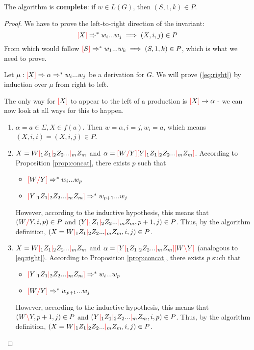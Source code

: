 \documentclass[main.tex]{subfiles}
\begin{document}
\begin{prop}
    The algorithm is \textbf{complete}: if $w \in L(G)$, then $(S, 1, k) \in P$.
\end{prop}
\begin{proof}
    We have to prove the left-to-right direction of the invariant:
    \begin{equation}\label{eq:right}
        \textcolor{red}{[} X \textcolor{red}{]} \Rightarrow^* w_i ... w_j \implies (X, i, j) \in P
    \end{equation}
    From which would follow $ \textcolor{red}{[} S \textcolor{red}{]} \Rightarrow^* w_1 ... w_k \implies (S, 1, k) \in P$,
    which is what we need to prove.

    Let $\mu: \textcolor{red}{[} X \textcolor{red}{]} \Rightarrow \alpha \Rightarrow^* w_i ... w_j$
    be a derivation for $G$. We will prove (\ref{eq:right}) by induction over
    $\mu$ from right to left.

    The only way for $\textcolor{red}{[} X \textcolor{red}{]}$ to appear to the left
    of a production is $\textcolor{red}{[} X \textcolor{red}{]} \rightarrow \alpha$ - we can now look at
    all ways for this to happen.
    \begin{enumerate}
        \item $\alpha = a \in \Sigma, X \in f(a)$. Then $w = \alpha, i = j, w_i = a$,
            which means $(X, i, i) = (X, i, j) \in P$.
        \item $X = W \textcolor{red}{|}_1 Z_1 \textcolor{red}{|}_2 Z_2 ... \textcolor{red}{|}_m Z_m$ and
            $\alpha = \textcolor{red}{[} W \textcolor{red}{/} Y \textcolor{red}{]} \textcolor{red}{[} Y \textcolor{red}{|}_1 Z_1 \textcolor{red}{|}_2 Z_2 ... \textcolor{red}{|}_m Z_m \textcolor{red}{]}$.
            According to Proposition \ref{prop:concat}, there exists $p$ such that
            \begin{itemize}
                \item $\textcolor{red}{[} W \textcolor{red}{/} Y \textcolor{red}{]} \Rightarrow^* w_i ... w_p$
                \item $\textcolor{red}{[} Y \textcolor{red}{|}_1 Z_1 \textcolor{red}{|}_2 Z_2 ... \textcolor{red}{|}_m Z_m \textcolor{red}{]} \Rightarrow^* w_{p+1} ... w_j$
            \end{itemize}
            However, according to the inductive hypothesis, this means that
            $(W \textcolor{red}{/} Y, i, p) \in P$ and
            $(Y \textcolor{red}{|}_1 Z_1 \textcolor{red}{|}_2 Z_2 ... \textcolor{red}{|}_m Z_m, p + 1, j) \in P$. Thus,
            by the algorithm definition,
            $(X = W \textcolor{red}{|}_1 Z_1 \textcolor{red}{|}_2 Z_2 ... \textcolor{red}{|}_m Z_m, i, j) \in P$.
        \item $X = W \textcolor{red}{|}_1 Z_1 \textcolor{red}{|}_2 Z_2 ... \textcolor{red}{|}_m Z_m$ and
            $\alpha = \textcolor{red}{[} Y \textcolor{red}{|}_1 Z_1 \textcolor{red}{|}_2 Z_2 ... \textcolor{red}{|}_m Z_m \textcolor{red}{]} \textcolor{red}{[} W \textcolor{red}{\backslash} Y \textcolor{red}{]}$
            (analogous to \ref{eq:right}).
            According to Proposition \ref{prop:concat}, there exists $p$ such that
            \begin{itemize}
                \item $\textcolor{red}{[} Y \textcolor{red}{|}_1 Z_1 \textcolor{red}{|}_2 Z_2 ... \textcolor{red}{|}_m Z_m \textcolor{red}{]} \Rightarrow^* w_i ... w_p$
                \item $\textcolor{red}{[} W \textcolor{red}{/} Y \textcolor{red}{]} \Rightarrow^* w_{p + 1} ... w_j$
            \end{itemize}
            However, according to the inductive hypothesis, this means that
            $(W \textcolor{red}{\backslash} Y, p + 1, j) \in P$ and
            $(Y \textcolor{red}{|}_1 Z_1 \textcolor{red}{|}_2 Z_2 ... \textcolor{red}{|}_m Z_m, i, p) \in P$. Thus,
            by the algorithm definition,
            $(X = W \textcolor{red}{|}_1 Z_1 \textcolor{red}{|}_2 Z_2 ... \textcolor{red}{|}_m Z_m, i, j) \in P$.
    \end{enumerate}


\end{proof}
\end{document}
